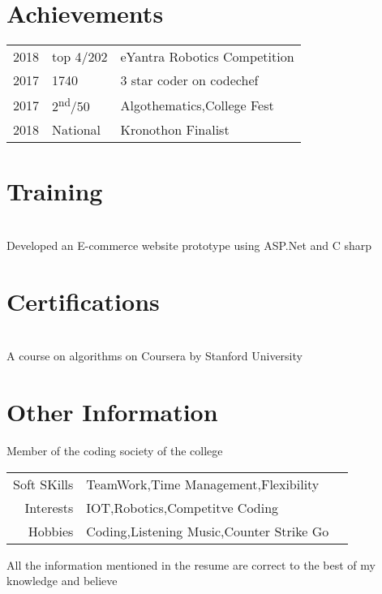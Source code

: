 \documentclass[]{resume-openfont}
\begin{document}
\begin{minipage}[t]{0.66\textwidth}

\section{Achievements} 
\begin{tabular}{rll}
2018	     & top 4/202  & eYantra Robotics Competition\\
2017	     & 1740  & 3 star coder on codechef\\
2017	     & 2\textsuperscript{nd}/50  & Algothematics,College Fest\\
2018	     & National  & Kronothon Finalist
\end{tabular}
\sectionsep
\section{Training }

\\
Developed an E-commerce website prototype using ASP.Net and C sharp
\sectionsep
\section{Certifications }
\\
A course on algorithms on Coursera by Stanford University
\sectionsep
\section{Other Information }
Member of the coding society of the college\\
\begin{tabular}{rll}
Soft SKills & TeamWork,Time Management,Flexibility\\
Interests & IOT,Robotics,Competitve Coding\\
Hobbies & Coding,Listening Music,Counter Strike Go
\end{tabular}
All the information mentioned in the resume are correct to the best of my knowledge and believe
\sectionsep
\end{minipage} 
\end{document}
